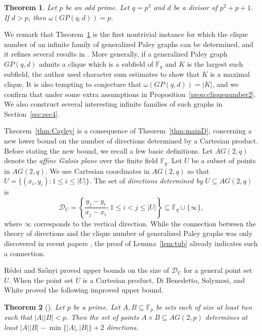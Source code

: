 \documentclass[12pt,reqno]{amsart}
\newtheorem{thm}{Theorem}[section]
\theoremstyle{definition}
\newcommand{\F}{\mathbb{F}}
\begin{document}
\begin{thm}\label{thm:cliquenumber}
Let $p$ be an odd prime.
Let $q=p^3$ and $d$ be a divisor of $p^2+p+1$. If $d>p$, then $\omega(GP(q,d))=p$.  
\end{thm}

We remark that Theorem~\ref{thm:cliquenumber} is the first nontrivial instance for which the clique number of an infinite family of generalized Paley graphs can be determined, and it refines several results in \cite{BDR88, Y22, Y23}. More generally, if a generalized Paley graph $GP(q,d)$ admits a clique which is a subfield of $\F_q$ and $K$ is the largest such subfield, the author \cite{Y23} used character sum estimates to show that $K$ is a maximal clique. It is also tempting to conjecture that $\omega(GP(q,d))=|K|$, and we confirm that under some extra assumptions in Proposition~\ref{prop:cliquenumber2}. We also construct several interesting infinite families of such graphs in Section~\ref{sec:sec4}.

Theorem~\ref{thm:Cayley} is a consequence of Theorem~\ref{thm:mainD}, concerning a new lower bound on the number of directions determined by a Cartesian product. Before stating the new bound, we recall a few basic definitions. Let $AG(2,q)$ denote the {\em affine Galois plane} over the finite field $\F_q$. Let $U$ be a subset of points in $AG(2,q)$. We use Cartesian coordinates in $AG(2,q)$ so that $U=\{(x_i,y_i):1 \leq i \leq |U|\}$.
The set of {\em directions determined by} $U \subseteq AG(2, q)$ is 
\[ \mathcal{D}_U=\left\{ \frac{y_j-y_i}{x_j-x_i} \colon 1\leq i <j \leq |U| \right \} \subseteq \F_q \cup \{\infty\},\]
 where $\infty$ corresponds to the vertical direction. While the connection between the theory of directions and the clique number of generalized Paley graphs was only discovered in recent papers \cite{HP, Yip2}, the proof of Lemma~\ref{lem:tub} already indicates such a connection. 

R\'edei \cite{LR73} and Sz\H{o}nyi \cite{S99} proved upper bounds on the size of $\mathcal{D}_U$ for a general point set $U$. When the point set $U$ is a Cartesian product, Di Benedetto, Solymosi, and White \cite{DSW} proved the following improved upper bound.

\begin{thm}[\cite{DSW}]\label{DSW}
Let $p$ be a prime. Let $A, B \subseteq \F_p$ be sets each of size at least two such that $|A||B| < p$. Then the set of points $A\times B\subseteq AG(2,p)$ determines at least $|A||B| - \min\{|A|,|B|\} + 2$ directions.
\end{thm}
\end{document}
